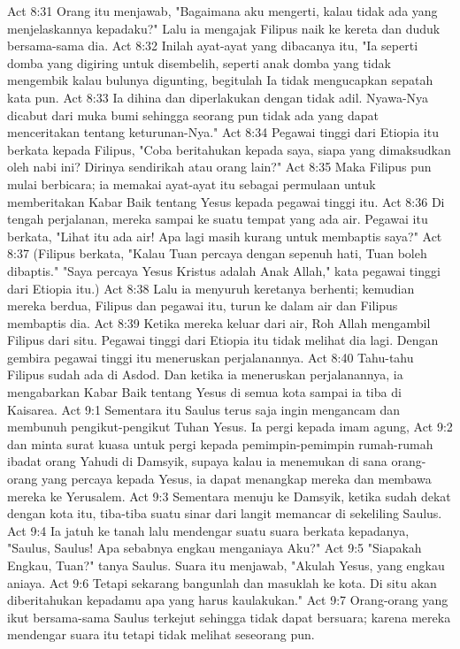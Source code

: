 Act 8:31  Orang itu menjawab, "Bagaimana aku mengerti, kalau tidak ada yang menjelaskannya kepadaku?" Lalu ia mengajak Filipus naik ke kereta dan duduk bersama-sama dia.
Act 8:32  Inilah ayat-ayat yang dibacanya itu, "Ia seperti domba yang digiring untuk disembelih, seperti anak domba yang tidak mengembik kalau bulunya digunting, begitulah Ia tidak mengucapkan sepatah kata pun.
Act 8:33  Ia dihina dan diperlakukan dengan tidak adil. Nyawa-Nya dicabut dari muka bumi sehingga seorang pun tidak ada yang dapat menceritakan tentang keturunan-Nya."
Act 8:34  Pegawai tinggi dari Etiopia itu berkata kepada Filipus, "Coba beritahukan kepada saya, siapa yang dimaksudkan oleh nabi ini? Dirinya sendirikah atau orang lain?"
Act 8:35  Maka Filipus pun mulai berbicara; ia memakai ayat-ayat itu sebagai permulaan untuk memberitakan Kabar Baik tentang Yesus kepada pegawai tinggi itu.
Act 8:36  Di tengah perjalanan, mereka sampai ke suatu tempat yang ada air. Pegawai itu berkata, "Lihat itu ada air! Apa lagi masih kurang untuk membaptis saya?"
Act 8:37  (Filipus berkata, "Kalau Tuan percaya dengan sepenuh hati, Tuan boleh dibaptis." "Saya percaya Yesus Kristus adalah Anak Allah," kata pegawai tinggi dari Etiopia itu.)
Act 8:38  Lalu ia menyuruh keretanya berhenti; kemudian mereka berdua, Filipus dan pegawai itu, turun ke dalam air dan Filipus membaptis dia.
Act 8:39  Ketika mereka keluar dari air, Roh Allah mengambil Filipus dari situ. Pegawai tinggi dari Etiopia itu tidak melihat dia lagi. Dengan gembira pegawai tinggi itu meneruskan perjalanannya.
Act 8:40  Tahu-tahu Filipus sudah ada di Asdod. Dan ketika ia meneruskan perjalanannya, ia mengabarkan Kabar Baik tentang Yesus di semua kota sampai ia tiba di Kaisarea.
Act 9:1  Sementara itu Saulus terus saja ingin mengancam dan membunuh pengikut-pengikut Tuhan Yesus. Ia pergi kepada imam agung,
Act 9:2  dan minta surat kuasa untuk pergi kepada pemimpin-pemimpin rumah-rumah ibadat orang Yahudi di Damsyik, supaya kalau ia menemukan di sana orang-orang yang percaya kepada Yesus, ia dapat menangkap mereka dan membawa mereka ke Yerusalem.
Act 9:3  Sementara menuju ke Damsyik, ketika sudah dekat dengan kota itu, tiba-tiba suatu sinar dari langit memancar di sekeliling Saulus.
Act 9:4  Ia jatuh ke tanah lalu mendengar suatu suara berkata kepadanya, "Saulus, Saulus! Apa sebabnya engkau menganiaya Aku?"
Act 9:5  "Siapakah Engkau, Tuan?" tanya Saulus. Suara itu menjawab, "Akulah Yesus, yang engkau aniaya.
Act 9:6  Tetapi sekarang bangunlah dan masuklah ke kota. Di situ akan diberitahukan kepadamu apa yang harus kaulakukan."
Act 9:7  Orang-orang yang ikut bersama-sama Saulus terkejut sehingga tidak dapat bersuara; karena mereka mendengar suara itu tetapi tidak melihat seseorang pun.
